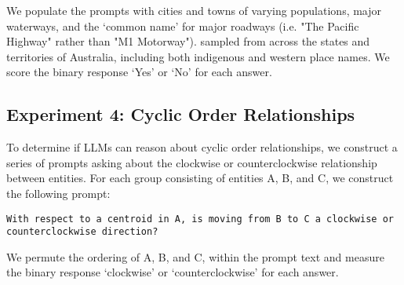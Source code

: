 \noindent We populate the prompts with cities and towns of varying populations, major waterways, and the `common name' for major roadways (i.e. "The Pacific Highway" rather than "M1 Motorway"). sampled from across the states and territories of Australia, including both indigenous and western place names.
We score the binary response `Yes' or `No' for each answer.

\subsection{Experiment 4: Cyclic Order Relationships}
To determine if LLMs can reason about cyclic order relationships, we construct a series of prompts asking about the clockwise or counterclockwise relationship between entities.
For each group consisting of entities A, B, and C, we construct the following prompt: 

\begin{lstlisting}[title=Prompt 12: Cyclic Order Relation Prompt]
    With respect to a centroid in A, is moving from B to C a clockwise or counterclockwise direction?
\end{lstlisting}

\noindent We permute the ordering of A, B, and C, within the prompt text and measure the binary response `clockwise' or `counterclockwise' for each answer.










